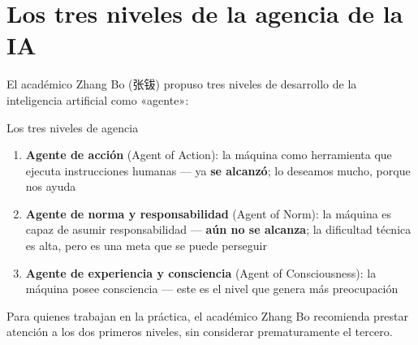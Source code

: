 \section{Los tres niveles de la agencia de la IA}

El académico Zhang Bo (张钹) propuso tres niveles de desarrollo de la inteligencia artificial como «agente»:

\begin{importantbox}{Los tres niveles de agencia}
\begin{enumerate}
\item \textbf{Agente de acción} (Agent of Action): la máquina como herramienta que ejecuta instrucciones humanas — ya \textbf{se alcanzó}; lo deseamos mucho, porque nos ayuda
\item \textbf{Agente de norma y responsabilidad} (Agent of Norm): la máquina es capaz de asumir responsabilidad — \textbf{aún no se alcanza}; la dificultad técnica es alta, pero es una meta que se puede perseguir
\item \textbf{Agente de experiencia y consciencia} (Agent of Consciousness): la máquina posee consciencia — este es el nivel que genera más preocupación
\end{enumerate}
\end{importantbox}

Para quienes trabajan en la práctica, el académico Zhang Bo recomienda prestar atención a los dos primeros niveles, sin considerar prematuramente el tercero.


